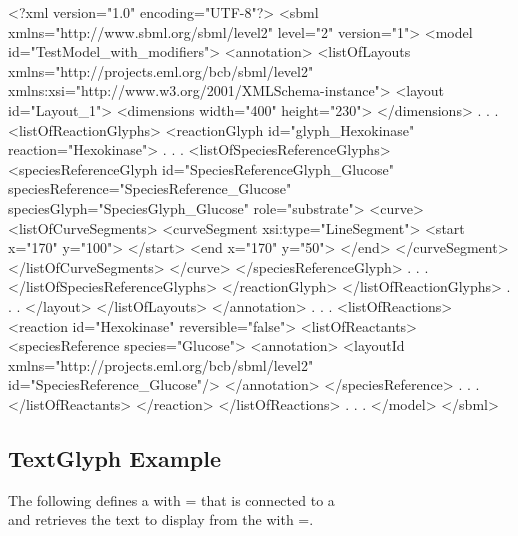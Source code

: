 \label{example:speciesreferenceid}
\begin{example}
<?xml version="1.0" encoding="UTF-8"?>
<sbml xmlns="http://www.sbml.org/sbml/level2" level="2" version="1">
  <model id="TestModel_with_modifiers">
    <annotation>
     <listOfLayouts xmlns="http://projects.eml.org/bcb/sbml/level2"
              xmlns:xsi="http://www.w3.org/2001/XMLSchema-instance">
      <layout id="Layout_1">
        <dimensions width="400" height="230">
        </dimensions>
              .
              .
              .
        <listOfReactionGlyphs>
          <reactionGlyph id="glyph_Hexokinase" reaction="Hexokinase">
                    .
                    .
                    .
            <listOfSpeciesReferenceGlyphs>
              <speciesReferenceGlyph id="SpeciesReferenceGlyph_Glucose"
                   speciesReference="SpeciesReference_Glucose"
                   speciesGlyph="SpeciesGlyph_Glucose" role="substrate">
                <curve>
                  <listOfCurveSegments>
                    <curveSegment xsi:type="LineSegment">
                      <start x="170" y="100">
                      </start>
                      <end x="170" y="50">
                      </end>
                    </curveSegment>
                  </listOfCurveSegments>
                </curve>
              </speciesReferenceGlyph>
                        .
                        .
                        . 
            </listOfSpeciesReferenceGlyphs>
          </reactionGlyph>
        </listOfReactionGlyphs>
             .
             .
             .
      </layout>
     </listOfLayouts>
    </annotation>
        .
        .
        .
    <listOfReactions>
      <reaction id="Hexokinase" reversible="false">
        <listOfReactants>
          <speciesReference species="Glucose">
            <annotation>
              <layoutId xmlns="http://projects.eml.org/bcb/sbml/level2"
                        id="SpeciesReference_Glucose"/>
            </annotation>
          </speciesReference>
                .
                .
                .
        </listOfReactants>
      </reaction>
    </listOfReactions>
          .
          .
          .  
  </model>
</sbml>
\end{example}


\subsection{TextGlyph Example}
The following defines a \TextGlyph with = 
that is connected to a \SpeciesGlyph \\  
and retrieves the text to display from the \Species with 
=. 

